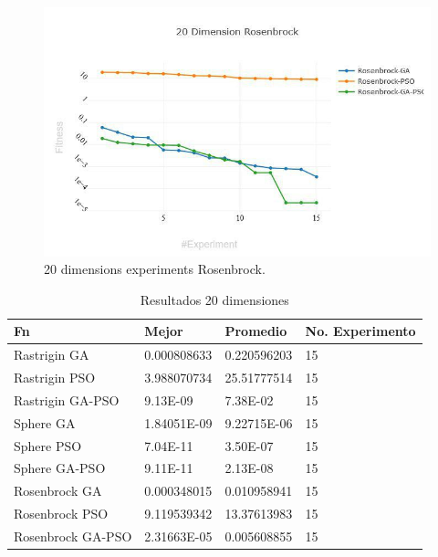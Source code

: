 \documentclass[runningheads]{llncs}
\begin{document}
                \begin{figure}[htp]
                  \includegraphics[width=\textwidth]{20-rosenbrock.jpg}
                  \caption{20 dimensions experiments Rosenbrock.} \label{fig1}
                  \end{figure}

                  \begin{table}[htp]

    \caption{Resultados 20 dimensiones}
    \label{table:resultados-2}
    \centering
    \begin{tabular}{|l|l|l|l|}
    \hline
    Fn & Mejor & Promedio & No. Experimento \\
    \hline
    \hline
    Rastrigin GA & 0.000808633 & 0.220596203 & 15\\
    \hline
    Rastrigin PSO & 3.988070734 & 25.51777514 & 15\\
    \hline
    Rastrigin GA-PSO & 9.13E-09 & 7.38E-02 & 15\\
    \hline
    Sphere GA & 1.84051E-09 & 9.22715E-06 & 15\\
    \hline
    Sphere PSO & 7.04E-11 & 3.50E-07 & 15\\
    \hline
    Sphere GA-PSO & 9.11E-11 & 2.13E-08 & 15\\
    \hline
    Rosenbrock GA & 0.000348015 & 0.010958941 & 15\\
    \hline
    Rosenbrock PSO & 9.119539342 & 13.37613983 & 15\\
    \hline
    Rosenbrock GA-PSO & 2.31663E-05 & 0.005608855 & 15\\
    \hline
    \end{tabular}
    \end{table}
\end{document}
